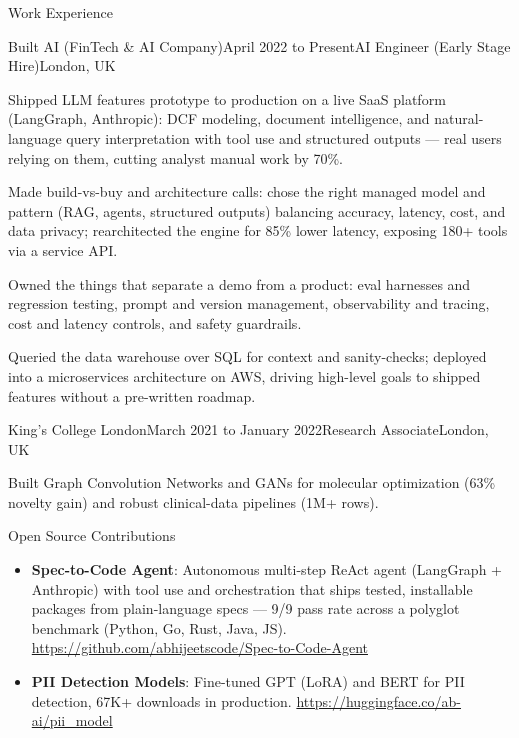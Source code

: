 \documentclass{resume} %
\begin{document}
\begin{rSection}{Work Experience}
\begin{rSubsection}{Built AI (FinTech \& AI Company)}{April 2022 to Present}{AI Engineer (Early Stage Hire)}{London, UK}
\item Shipped LLM features prototype to production on a live SaaS platform (LangGraph, Anthropic): DCF modeling, document intelligence, and natural-language query interpretation with tool use and structured outputs --- real users relying on them, cutting analyst manual work by 70\%.
\item Made build-vs-buy and architecture calls: chose the right managed model and pattern (RAG, agents, structured outputs) balancing accuracy, latency, cost, and data privacy; rearchitected the engine for 85\% lower latency, exposing 180+ tools via a service API.
\item Owned the things that separate a demo from a product: eval harnesses and regression testing, prompt and version management, observability and tracing, cost and latency controls, and safety guardrails.
\item Queried the data warehouse over SQL for context and sanity-checks; deployed into a microservices architecture on AWS, driving high-level goals to shipped features without a pre-written roadmap.
\end{rSubsection}


\begin{rSubsection}{King's College London}{March 2021 to January 2022}{Research Associate}{London, UK}
\item Built Graph Convolution Networks and GANs for molecular optimization (63\% novelty gain) and robust clinical-data pipelines (1M+ rows).

\end{rSubsection}

\end{rSection}

\begin{rSection}{Open Source Contributions}
\begin{itemize}\setlength\itemsep{-0.4em}
    \item \textbf{Spec-to-Code Agent}: Autonomous multi-step ReAct agent (LangGraph + Anthropic) with tool use and orchestration that ships tested, installable packages from plain-language specs --- 9/9 pass rate across a polyglot benchmark (Python, Go, Rust, Java, JS). \url{https://github.com/abhijeetscode/Spec-to-Code-Agent}
    \item \textbf{PII Detection Models}: Fine-tuned GPT (LoRA) and BERT for PII detection, 67K+ downloads in production. \url{https://huggingface.co/ab-ai/pii_model}

\end{itemize}
\end{rSection}
\end{document}
